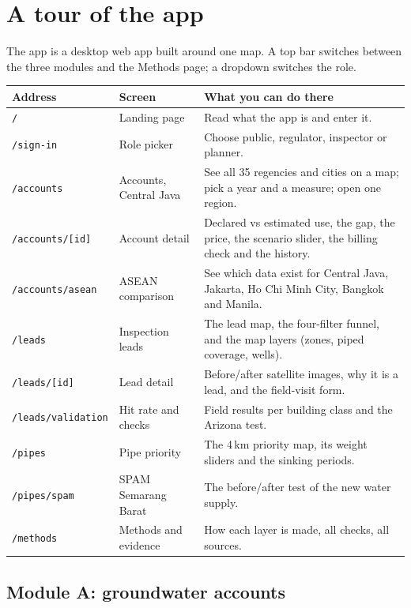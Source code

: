 \documentclass[11pt,a4paper]{article}
\newcommand{\route}[1]{\texttt{\small #1}}
\begin{document}
\section{A tour of the app}\label{sec:tour}

The app is a desktop web app built around one map. A top bar switches between the three modules and the
Methods page; a dropdown switches the role.

\begin{center}
\small
\begin{tabularx}{\linewidth}{@{}L{34mm}L{35mm}Y@{}}
\toprule
\textbf{Address} & \textbf{Screen} & \textbf{What you can do there}\\
\midrule
\route{/} & Landing page & Read what the app is and enter it.\\
\route{/sign-in} & Role picker & Choose public, regulator, inspector or planner.\\
\route{/accounts} & Accounts, Central Java & See all 35 regencies and cities on a map; pick a year and a
  measure; open one region.\\
\route{/accounts/[id]} & Account detail & Declared vs estimated use, the gap, the price, the scenario slider,
  the billing check and the history.\\
\route{/accounts/asean} & ASEAN comparison & See which data exist for Central Java, Jakarta, Ho Chi Minh
  City, Bangkok and Manila.\\
\route{/leads} & Inspection leads & The lead map, the four-filter funnel, and the map layers (zones, piped
  coverage, wells).\\
\route{/leads/[id]} & Lead detail & Before/after satellite images, why it is a lead, and the field-visit
  form.\\
\route{/leads/validation} & Hit rate and checks & Field results per building class and the Arizona test.\\
\route{/pipes} & Pipe priority & The 4\,km priority map, its weight sliders and the sinking periods.\\
\route{/pipes/spam} & SPAM Semarang Barat & The before/after test of the new water supply.\\
\route{/methods} & Methods and evidence & How each layer is made, all checks, all sources.\\
\bottomrule
\end{tabularx}
\end{center}

\subsection{Module A: groundwater accounts}
\end{document}
